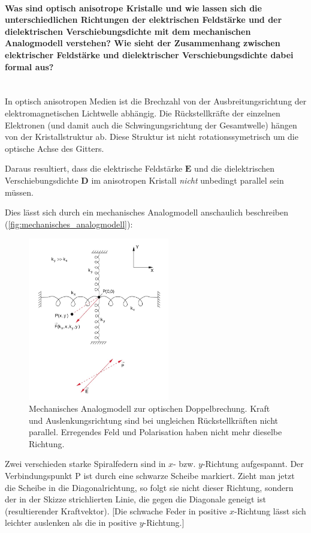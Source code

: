 \documentclass[a4paper, 11pt, ngerman, parskip=half-]{scrartcl}
\newcommand{\myparagraph}[1]{\paragraph{#1}\mbox{}\\}
\begin{document}
\myparagraph{Was sind optisch anisotrope Kristalle und wie lassen sich die unterschiedlichen Richtungen der elektrischen Feldstärke und der dielektrischen Verschiebungsdichte mit dem mechanischen Analogmodell verstehen? Wie sieht der Zusammenhang zwischen elektrischer Feldstärke und dielektrischer Verschiebungsdichte dabei formal aus?}
%
In optisch anisotropen Medien ist die Brechzahl von der Ausbreitungsrichtung der elektromagnetischen Lichtwelle abhängig. Die Rückstellkräfte der einzelnen Elektronen (und damit auch die Schwingungsrichtung der Gesamtwelle) hängen von der Kristallstruktur ab. Diese Struktur ist nicht rotationssymetrisch um die optische Achse des Gitters.

Daraus resultiert, dass die elektrische Feldstärke $\textbf{E}$ und die dielektrischen Verschiebungsdichte $\textbf{D}$ im anisotropen Kristall \textit{nicht} unbedingt parallel sein müssen.

Dies lässt sich durch ein mechanisches Analogmodell anschaulich beschreiben (\autoref{fig:mechanisches_analogmodell}):
%
\begin{figure}[!h]
    \centering
    \begin{samepage}
        \includegraphics[width=0.55\textwidth]{image/15/mechanisches_modell.jpg}
        \caption{Mechanisches Analogmodell zur optischen Doppelbrechung. Kraft und Auslenkungsrichtung sind bei ungleichen Rückstellkräften nicht parallel. Erregendes Feld und Polarisation haben nicht mehr dieselbe Richtung.}
        \label{fig:mechanisches_analogmodell}
    \end{samepage}
\end{figure}
%
Zwei verschieden starke Spiralfedern sind in $x$- bzw. $y$-Richtung aufgespannt. Der Verbindungspunkt P ist durch eine schwarze Scheibe markiert. Zieht man jetzt die Scheibe in die Diagonalrichtung, so folgt sie nicht dieser Richtung, sondern der in der Skizze strichlierten Linie, die gegen die Diagonale geneigt ist (resultierender Kraftvektor). [Die schwache Feder in positive $x$-Richtung lässt sich leichter auslenken als die in positive $y$-Richtung.]
\end{document}
